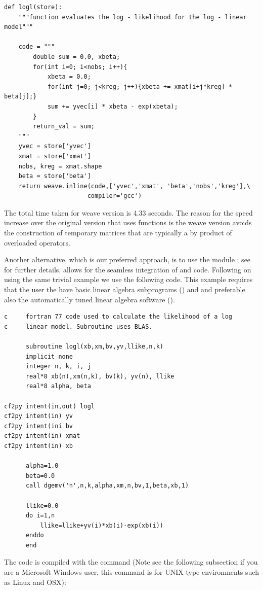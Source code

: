 \documentclass[article]{jss}
\begin{document}
\begin{lstlisting}[basicstyle={\scriptsize}]
def logl(store):
    """function evaluates the log - likelihood for the log - linear model"""

    code = """     
		double sum = 0.0, xbeta;
		for(int i=0; i<nobs; i++){
			xbeta = 0.0;
			for(int j=0; j<kreg; j++){xbeta += xmat[i+j*kreg] * beta[j];}
			sum += yvec[i] * xbeta - exp(xbeta);
		}     
		return_val = sum;
    """
    yvec = store['yvec']
    xmat = store['xmat']
	nobs, kreg = xmat.shape
	beta = store['beta']
    return weave.inline(code,['yvec','xmat', 'beta','nobs','kreg'],\ 
                       compiler='gcc')
\end{lstlisting}


The total time taken for weave version is 4.33 seconds. The reason for
the speed increase over the original version that uses \pkg{Numpy}
functions is the weave version avoids the construction of temporary
matrices that are typically a by product of overloaded operators.

Another alternative, which is our preferred approach, is to use the
\proglang{Python} module ; see \citet{F2PY} for further
details. \pkg{F2py} allows for the seamless integration of
 and  code. Following on using the
same trivial example we use the following \proglang{Fortran77} code.
This example requires that the user the have basic linear algebra
subprograms (\pkg{BLAS}) and and preferable also the automatically
tuned
linear algebra software ().\\
 
\begin{lstlisting}[basicstyle={\scriptsize}]
c     fortran 77 code used to calculate the likelihood of a log
c     linear model. Subroutine uses BLAS.

      subroutine logl(xb,xm,bv,yv,llike,n,k)
      implicit none
      integer n, k, i, j
      real*8 xb(n),xm(n,k), bv(k), yv(n), llike
      real*8 alpha, beta

cf2py intent(in,out) logl
cf2py intent(in) yv
cf2py intent(ini bv
cf2py intent(in) xmat 
cf2py intent(in) xb 

      alpha=1.0
      beta=0.0
      call dgemv('n',n,k,alpha,xm,n,bv,1,beta,xb,1)

      llike=0.0
      do i=1,n
          llike=llike+yv(i)*xb(i)-exp(xb(i))
      enddo
      end
\end{lstlisting}


The code is compiled with the command (Note see the following
subsection if you are a Microsoft Windows user, this command is for
UNIX type environments such as Linux and OSX):
\end{document}
